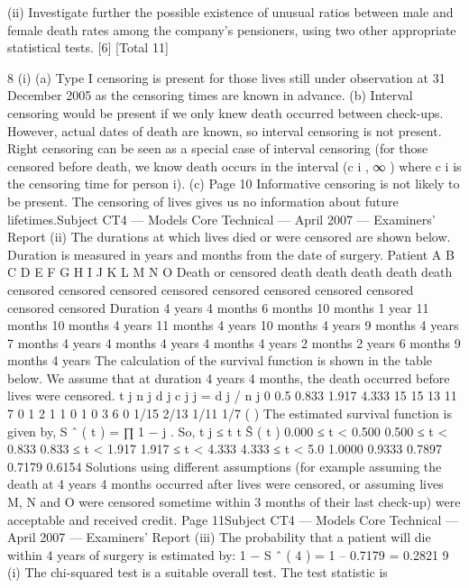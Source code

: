 \documentclass[a4paper,12pt]{article}
\begin{document}
\begin{enumerate}
(ii) Investigate further the possible existence of unusual ratios between male and
female death rates among the company’s pensioners, using two other
appropriate statistical tests.
[6]
[Total 11]

8
(i)
(a) Type I censoring is present for those lives still under observation at 31
December 2005 as the censoring times are known in advance.
(b) Interval censoring would be present if we only knew death occurred
between check-ups. However, actual dates of death are known, so
interval censoring is not present.
Right censoring can be seen as a special case of interval censoring (for
those censored before death, we know death occurs in the interval (c i ,
∞ ) where c i is the censoring time for person i).
(c)
Page 10
Informative censoring is not likely to be present. The censoring of
lives gives us no information about future lifetimes.Subject CT4 — Models Core Technical — April 2007 — Examiners’ Report
(ii)
The durations at which lives died or were censored are shown below. Duration
is measured in years and months from the date of surgery.
Patient
A
B
C
D
E
F
G
H
I
J
K
L
M
N
O
Death or censored
death
death
death
death
death
censored
censored
censored
censored
censored
censored
censored
censored
censored
censored
Duration
4 years 4 months
6 months
10 months
1 year 11 months
10 months
4 years 11 months
4 years 10 months
4 years 9 months
4 years 7 months
4 years 4 months
4 years 4 months
4 years 2 months
2 years 6 months
9 months
4 years
The calculation of the survival function is shown in the table below. We
assume that at duration 4 years 4 months, the death occurred before lives were
censored.
t j n j d j c j \hat{\lambda} j = d j / n j
0
0.5
0.833
1.917
4.333 15
15
13
11
7 0
1
2
1
1 0
1
0
3
6 0
1/15
2/13
1/11
1/7
(
)
The estimated survival function is given by, S ˆ ( t ) = ∏ 1 − \lambda j . So,
t j ≤ t
t Ŝ ( t )
0.000 ≤ t < 0.500
0.500 ≤ t < 0.833
0.833 ≤ t < 1.917
1.917 ≤ t < 4.333
4.333 ≤ t < 5.0 1.0000
0.9333
0.7897
0.7179
0.6154
Solutions using different assumptions (for example assuming the death at 4
years 4 months occurred after lives were censored, or assuming lives M, N
and O were censored sometime within 3 months of their last check-up) were
acceptable and received credit.
Page 11Subject CT4 — Models Core Technical — April 2007 — Examiners’ Report
(iii)
The probability that a patient will die within 4 years of surgery is estimated
by:
1 − S ˆ ( 4 ) = 1 – 0.7179
= 0.2821
9
(i)
The chi-squared test is a suitable overall test.
The test statistic is

\end{enumerate}
\end{document}
